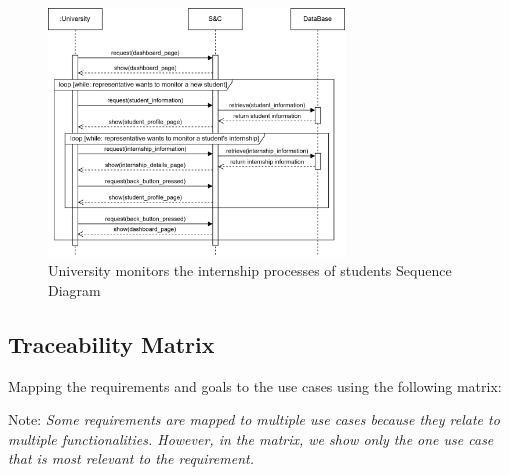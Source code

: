 \begin{figure}[H]
    \centering
    \includegraphics[width=0.70\textwidth]{Images/Sequence_Diagrams/monitor_SD.png}
    \caption{University monitors the internship processes of students Sequence Diagram}
\end{figure}


\subsection{Traceability Matrix}
Mapping the requirements and goals to the use cases using the following matrix:

Note: \textit{Some requirements are mapped to multiple use cases because they relate to multiple functionalities.
However, in the matrix, we show only the one use case that is most relevant to the requirement.}

